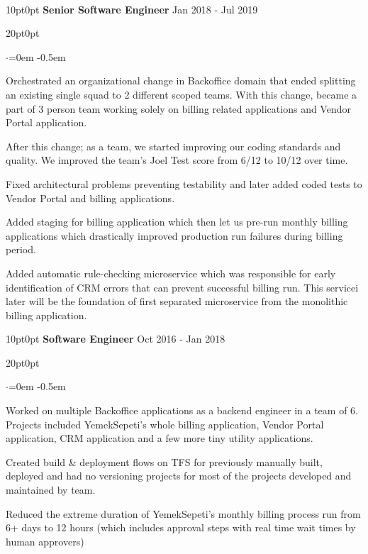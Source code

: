 \documentclass{article}
\newenvironment{rExpDetailsByTitle}[2]{
    \begin{adjustwidth}{10pt}{0pt}
    {\bf #1} \hfill {#2}
    \vspace{0.5em}
    \end{adjustwidth}
    \begin{adjustwidth}{20pt}{0pt}
    \begin{list}
    {$\cdot$}{\leftmargin=0em}
    \itemsep -0.5em \vspace{-0.5em}
}{
    \end{list}
    \vspace{0.3em}
    \end{adjustwidth}
}
\newcommand{\ys}{YemekSepeti\xspace}
\begin{document}
\phantom{This is a trick to allow one new line invisibly} \\
\phantom{A newline has to follow a non empty paragraph next, so this is part of the trick as well}

\begin{rExpDetailsByTitle}
    {Senior Software Engineer}
    {Jan 2018 - Jul 2019}
    \item Orchestrated an organizational change in Backoffice domain that ended splitting an existing single squad to 2 different scoped teams. With this change, became a part of 3 person team working solely on billing related applications and Vendor Portal application.
    \item After this change; as a team, we started improving our coding standards and quality. We improved the team's Joel Test score from 6/12 to 10/12 over time.
    \item Fixed architectural problems preventing testability and later added coded tests to Vendor Portal and billing applications.
    \item Added staging for billing application which then let us pre-run monthly billing applications which drastically improved production run failures during billing period.
    \item Added automatic rule-checking microservice which was responsible for early identification of CRM errors that can prevent successful billing run. This servicei later will be the foundation of first separated microservice from the monolithic billing application.
\end{rExpDetailsByTitle}

\begin{rExpDetailsByTitle}
    {Software Engineer}
    {Oct 2016 - Jan 2018}
    \item Worked on multiple Backoffice applications as a backend engineer in a team of 6. Projects included \ys's whole billing application, Vendor Portal application, CRM application and a few more tiny utility applications.
    \item Created build \& deployment flows on TFS for previously manually built, deployed and had no versioning projects for most of the projects developed and maintained by team.
    \item Reduced the extreme duration of \ys's monthly billing process run from 6+ days to 12 hours (which includes approval steps with real time wait times by human approvers)
\end{rExpDetailsByTitle}
\end{document}
